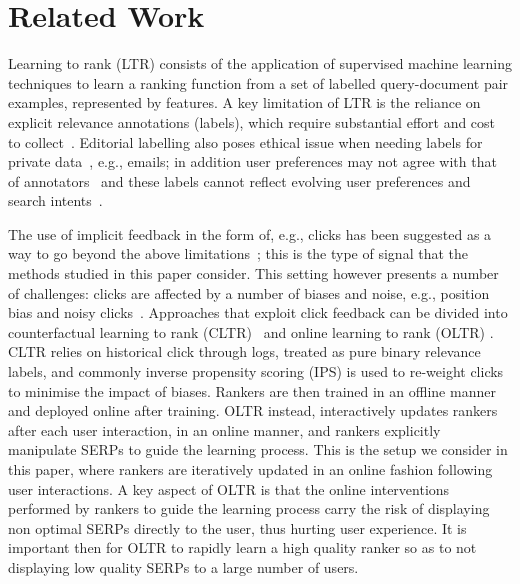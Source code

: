 \section{Related Work}

Learning to rank (LTR) consists of the application of supervised machine learning techniques to learn a ranking function from a set of labelled query-document pair examples, represented by features. A key limitation of LTR is the reliance on explicit relevance annotations (labels), which require substantial effort and cost to collect~\cite{DBLP:journals/corr/QinL13,DBLP:journals/jmlr/ChapelleC11}. Editorial labelling also poses ethical issue when needing labels for private data~\cite{wang2016learning}, e.g., emails; in addition user preferences may not agree with that of annotators~\cite{sanderson2010test} and these labels cannot reflect evolving user preferences and search intents~\cite{lefortier2014online}.

The use of implicit feedback in the form of, e.g., clicks has been suggested as a way to go beyond the above limitations~\cite{joachims2002optimizing}; this is the type of signal that the methods studied in this paper consider. 
This setting however presents a number of challenges: clicks are affected by a number of biases and noise, e.g., position bias and noisy clicks~\cite{guan2007eye,joachims2017unbiased,pan2007google}. Approaches that exploit click feedback can be divided into counterfactual learning to rank (CLTR)~\cite{joachims2017unbiased} and online learning to rank (OLTR) \cite{yue2009interactively}. CLTR relies on historical click through logs, treated as pure binary relevance labels, and commonly inverse propensity scoring (IPS) is used to re-weight clicks to minimise the impact of biases. Rankers are then trained in an offline manner and deployed online after training. 
OLTR instead, interactively updates rankers after each user interaction, in an online manner, and rankers explicitly manipulate SERPs to guide the learning process. This is the setup we consider in this paper, where rankers are iteratively updated in an online fashion following user interactions. A key aspect of OLTR is that the online interventions performed by rankers to guide the learning process carry the risk of displaying non optimal SERPs directly to the user, thus hurting user experience. It is important then for OLTR to rapidly learn a high quality ranker so as to not displaying low quality SERPs to a large number of users.

